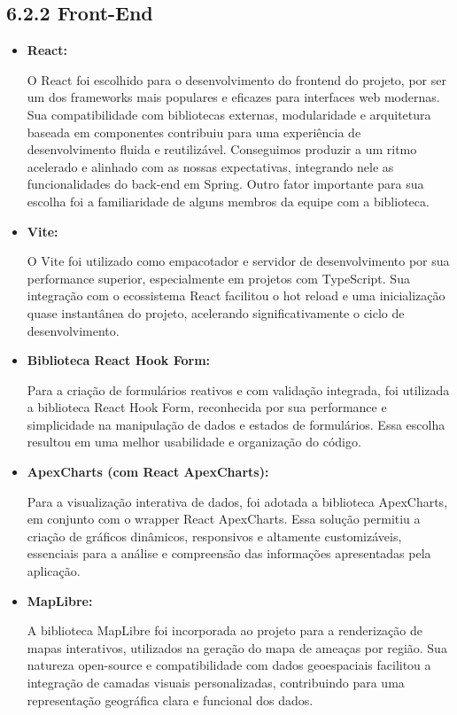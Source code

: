 \documentclass[12pt,a4paper]{report}
\begin{document}
\subsection{6.2.2 Front-End}
\begin{itemize}

\item \textbf{React: }

O React foi escolhido para o desenvolvimento do frontend do projeto, por ser um dos frameworks mais populares e eficazes para interfaces web modernas. Sua compatibilidade com bibliotecas externas, modularidade e arquitetura baseada em componentes contribuiu para uma experiência de desenvolvimento fluida e reutilizável. Conseguimos produzir a um ritmo acelerado e alinhado com as nossas expectativas, integrando nele as funcionalidades do back-end em Spring. Outro fator importante para sua escolha foi a familiaridade de alguns membros da equipe com a biblioteca.

\item \textbf{Vite: }

O Vite foi utilizado como empacotador e servidor de desenvolvimento por sua performance superior, especialmente em projetos com TypeScript. Sua integração com o ecossistema React facilitou o hot reload e uma inicialização quase instantânea do projeto, acelerando significativamente o ciclo de desenvolvimento.

\item \textbf{Biblioteca React Hook Form: }

Para a criação de formulários reativos e com validação integrada, foi utilizada a biblioteca React Hook Form, reconhecida por sua performance e simplicidade na manipulação de dados e estados de formulários. Essa escolha resultou em uma melhor usabilidade e organização do código.

\item \textbf{ApexCharts (com React ApexCharts): }

Para a visualização interativa de dados, foi adotada a biblioteca ApexCharts, em conjunto com o wrapper React ApexCharts. Essa solução permitiu a criação de gráficos dinâmicos, responsivos e altamente customizáveis, essenciais para a análise e compreensão das informações apresentadas pela aplicação.

\item \textbf{MapLibre: }

A biblioteca MapLibre foi incorporada ao projeto para a renderização de mapas interativos, utilizados na geração do mapa de ameaças por região. Sua natureza open-source e compatibilidade com dados geoespaciais facilitou a integração de camadas visuais personalizadas, contribuindo para uma representação geográfica clara e funcional dos dados.


\end{itemize}
\end{document}
